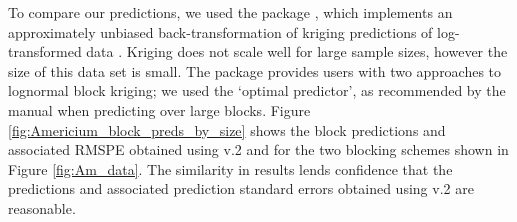 \documentclass[article]{jss}
\begin{document}
To compare our predictions, we used the  package  \citep{georob}, which implements an approximately unbiased back-transformation of kriging predictions of log-transformed data \citep{Cressie_2006_block_kriging_lognormal_spatial_processes}. 
Kriging does not scale well for large sample sizes, however %
 the size of this data set is small. %
 The package  provides users with two approaches to lognormal block kriging; 
we used the `optimal predictor', as recommended by the  manual when predicting over large blocks.
Figure \ref{fig:Americium_block_preds_by_size} shows the block predictions and associated RMSPE obtained using  v.2 and  for the two blocking schemes shown in Figure \ref{fig:Am_data}.
The similarity in results lends confidence that the predictions and associated prediction standard errors obtained using  v.2 are reasonable.
\end{document}
